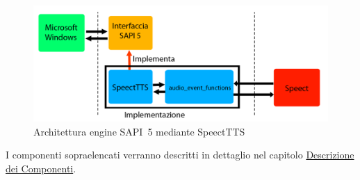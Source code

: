 \begin{figure}[H]
	\centering
	\includegraphics[width=\textwidth]{images/SpeectTTS-sapi5.png}
	\caption{Architettura engine SAPI~5 mediante SpeectTTS}
\end{figure}

I componenti sopraelencati verranno descritti in dettaglio nel capitolo \hyperref[chap:descrizione-dei-componenti]{Descrizione dei Componenti}.
	
	